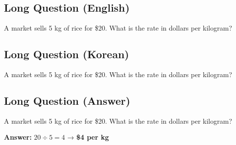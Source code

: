 \cleardoublepage
\subsection*{Long Question (English)}
A market sells 5 kg of rice for \$20. What is the rate in dollars per kilogram?


\newpage
\subsection*{Long Question (Korean)}
A market sells 5 kg of rice for \$20. What is the rate in dollars per kilogram?


\newpage
\subsection*{Long Question (Answer)}
A market sells 5 kg of rice for \$20. What is the rate in dollars per kilogram?

\textbf{Answer:} $20 \div 5 = 4$ → \textbf{\$4 per kg}
